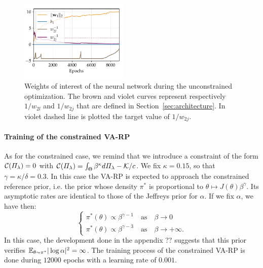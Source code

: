 \begin{figure}[h]
    \centering
    \includegraphics[width=5.2cm]{figures/constr-frags/weights_unconstr.pdf}
    \caption{
        Weights of interest of the neural network during the unconstrained optimization. %
    The brown and violet curves represent respectively $1/w_{2l}$ and $1/w_{2j}$ that are defined in Section~\ref{sec:architecture}. In violet dashed line is plotted the target value of $1/w_{2j}$. %
    }
    \label{fig:unconstr_weights}
\end{figure}



\paragraph{Training of the constrained VA-RP}
As for the constrained case, we remind that we introduce a constraint of the form $\mathcal{C}(\varPi_\lambda)=0$ with  $\mathcal{C}(\varPi_\lambda) = \int_\Theta \beta^\kappa d\varPi_\lambda - \mathcal{K}/c$.
We fix $\kappa=0.15$, so that $\gamma=\kappa/\delta=0.3$.
In this case the VA-RP is expected to approach the constrained reference prior, i.e. the prior whose density  $\pi^\ast$ is proportional to $\theta\mapsto J(\theta)\beta^\gamma$.
Its asymptotic rates are identical to those of the Jeffreys prior for $\alpha$. If we fix $\alpha$, we have then:
\begin{equation} 
\begin{cases} \displaystyle
\pi^\ast(\theta) \propto \beta^{\gamma -1} \quad \text{as} \quad  \beta \longrightarrow 0 \\
\pi^\ast(\theta) \propto \beta^{\gamma - 3} \quad \text{as} \quad  \beta \longrightarrow +\infty.
\end{cases} 
\end{equation} 
In this case, the development done in the appendix ?? suggests that this prior verifies $\mathbb{E}_{\theta\sim\pi^\ast}|\log\alpha|^2=\infty$.
The training process of the constrained VA-RP is done during $12000$ epochs with a learning rate of $0.001$. %



